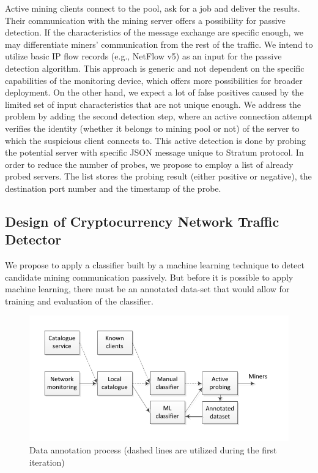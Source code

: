 \documentclass[preprint,12pt,3p]{elsarticle}
\begin{document}
Active mining clients connect to the pool, ask for a job and deliver the results. Their communication with the mining server offers a possibility for passive detection. If the characteristics of the message exchange are specific enough, we may differentiate miners’ communication from the rest of the traffic. We intend to utilize basic IP flow records (e.g., NetFlow v5) as an input for the passive detection algorithm. This approach is generic and not dependent on the specific capabilities of the monitoring device, which offers more possibilities for broader deployment. On the other hand, we expect a lot of false positives caused by the limited set of input characteristics that are not unique enough. We address the problem by adding the second detection step, where an active connection attempt verifies the identity (whether it belongs to mining pool or not) of the server to which the suspicious client connects to. This active detection is done by probing the potential server with specific JSON message unique to Stratum protocol.
In order to reduce the number of probes, we propose to employ a list of already probed servers. The list stores the probing result (either positive or negative), the destination port number and the timestamp of the probe.
 
\subsection{Design of Cryptocurrency Network Traffic Detector}
\label{subsec41}

We propose to apply a classifier built by a machine learning technique to detect candidate mining communication passively.
But before it is possible to apply machine learning, there must be an annotated data-set that would allow for training and evaluation of the classifier.

\begin{figure}[ht]
    \centering
    \includegraphics[width=\textwidth]{annotationscheme.pdf}
    \caption{Data annotation process (dashed lines are utilized during the first iteration)}
    \label{fig:scheme}
\end{figure}
\end{document}
